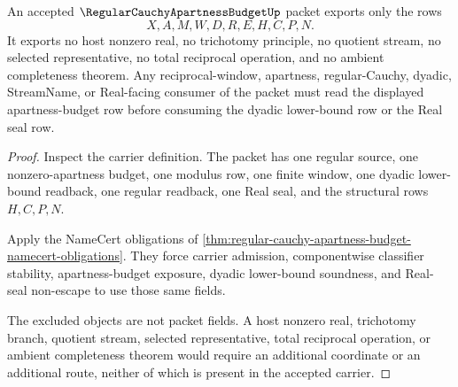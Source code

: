 \begin{theorem}
\label{thm:regular-cauchy-apartness-budget-nonescape}
An accepted $\RegularCauchyApartnessBudgetUp$ packet exports only the rows
$$
X,A,M,W,D,R,E,H,C,P,N.
$$
It exports no host nonzero real, no trichotomy principle, no quotient stream, no selected representative, no total reciprocal operation, and no ambient completeness theorem. Any reciprocal-window, apartness, regular-Cauchy, dyadic, StreamName, or Real-facing consumer of the packet must read the displayed apartness-budget row before consuming the dyadic lower-bound row or the Real seal row.
\end{theorem}
\begin{proof}
Inspect the carrier definition. The packet has one regular source, one nonzero-apartness budget, one modulus row, one finite window, one dyadic lower-bound readback, one regular readback, one Real seal, and the structural rows $H,C,P,N$.

Apply the NameCert obligations of \autoref{thm:regular-cauchy-apartness-budget-namecert-obligations}. They force carrier admission, componentwise classifier stability, apartness-budget exposure, dyadic lower-bound soundness, and Real-seal non-escape to use those same fields.

The excluded objects are not packet fields. A host nonzero real, trichotomy branch, quotient stream, selected representative, total reciprocal operation, or ambient completeness theorem would require an additional coordinate or an additional route, neither of which is present in the accepted carrier.
\end{proof}

